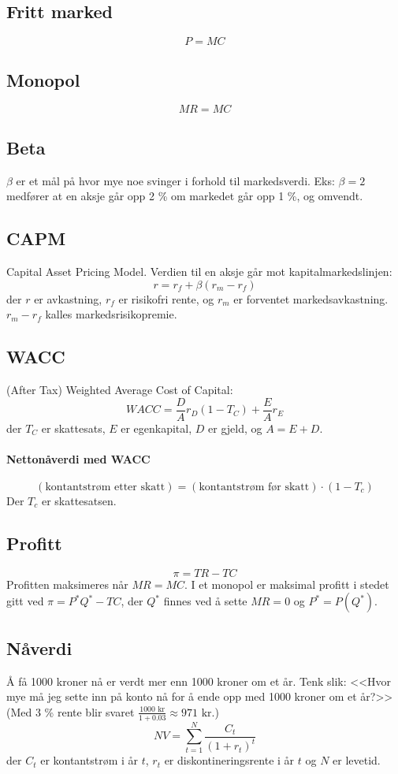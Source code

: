 \documentclass[a4paper]{article}
\newcommand{\kr}{\text{ kr}}
\begin{document}
\subsection*{Fritt marked}
$$P = MC$$

\subsection*{Monopol}
$$MR = MC$$

\subsection*{Beta} $\beta$ er et mål på hvor mye noe svinger i forhold til markedsverdi. Eks: $\beta = 2$ medfører at en aksje går opp 2 \% om markedet går opp 1 \%, og omvendt.

\subsection*{CAPM}
Capital Asset Pricing Model. Verdien til en aksje går mot kapitalmarkedslinjen: $$r = r_f + \beta (r_m - r_f)$$
der $r$ er avkastning, $r_f$ er risikofri rente, og $r_m$ er forventet markedsavkastning. $r_m - r_f$ kalles markedsrisikopremie.

\subsection*{WACC}
(After Tax) Weighted Average Cost of Capital:
$$WACC = \frac{D}{A} r_D(1-T_C) + \frac{E}{A} r_E$$
der $T_C$ er skattesats, $E$ er egenkapital, $D$ er gjeld, og $A = E + D$.
\paragraph{Nettonåverdi med WACC}
$$(\text{kontantstrøm etter skatt}) = (\text{kontantstrøm før skatt}) \cdot (1-T_c)$$
Der $T_c$ er skattesatsen.

\subsection*{Profitt}
$$\pi = TR - TC$$
Profitten maksimeres når $MR = MC$. I et monopol er maksimal profitt i stedet gitt ved $\pi = P^*Q^*-TC$, der $Q^*$ finnes ved å sette $MR = 0$ og $P^* = P(Q^*)$.

\subsection*{Nåverdi}
Å få 1000 kroner nå er verdt mer enn 1000 kroner om et år. Tenk slik: <<Hvor mye må jeg sette inn på konto nå for å ende opp med 1000 kroner om et år?>> (Med 3 \% rente blir svaret $\frac{1000 \kr}{1 + 0.03} \approx 971 \kr$.)
$$NV = \sum_{t=1}^{N} \frac{C_t}{(1+r_t)^t}$$
der $C_t$ er kontantstrøm i år $t$, $r_t$ er diskontineringsrente i år $t$ og $N$ er levetid.
\end{document}
